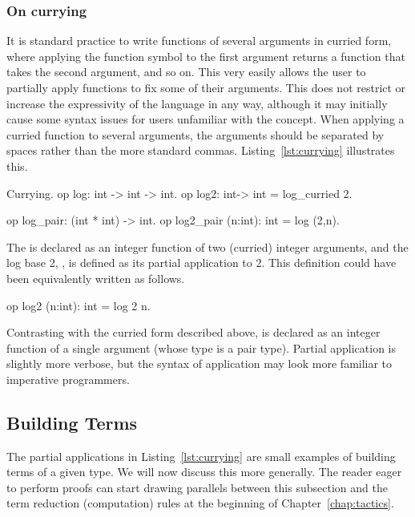 \subsubsection*{On currying}
It is standard practice to write functions of several arguments in curried form,
where applying the function symbol to the first argument returns a function that
takes the second argument, and so on. This very easily allows the user to
partially apply functions to fix some of their arguments. This does not restrict
or increase the expressivity of the language in any way, although it may
initially cause some syntax issues for users unfamiliar with the concept. When
applying a curried function to several arguments, the arguments should be
separated by spaces rather than the more standard commas.
Listing~\ref{lst:currying} illustrates this.

\begin{easycrypt}[label={lst:currying}]{Currying.}
op log: int -> int -> int.
op log2: int-> int = log_curried 2.

op log_pair: (int * int) -> int.
op log2_pair (n:int): int = log (2,n).
\end{easycrypt}

The  is declared as an integer function of two (curried) integer
arguments, and the log base 2, , is defined as its partial
application to 2. This definition could have been equivalently written as
follows.
\begin{easycrypt}[frame=none]{}
op log2 (n:int): int = log 2 n.
\end{easycrypt}
Contrasting with the curried form described above,  is declared
as an integer function of a single argument (whose type is a pair type).
Partial application is slightly more verbose, but the syntax of application may
look more familiar to imperative programmers.

\subsection{Building Terms}
The partial applications in Listing~\ref{lst:currying} are small examples of
building terms of a given type. We will now discuss this more generally. The
reader eager to perform proofs can start drawing parallels between this
subsection and the term reduction (computation) rules at the beginning of
Chapter~\ref{chap:tactics}. %

